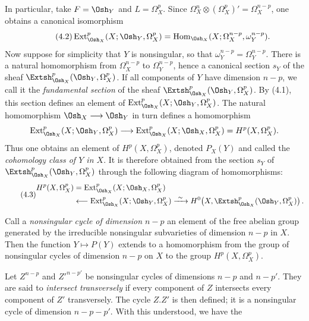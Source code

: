 In particular, take $F=\Osh_Y$ and $L=\Omega_X^{p}$. Since
$\Omega_X^{n}\otimes(\Omega_X^{p})'=\Omega_X^{n-p}$, one obtains a canonical
isomorphism
\begin{equation}\tag{4.2}
  \operatorname{Ext}_{\Osh_X}^{p}(X;\Osh_Y,\Omega_X^{p})
  =\operatorname{Hom}_{\Osh_X}
  (X;\Omega_X^{n-p},\omega_Y^{n-p}).
\end{equation}
Now suppose for simplicity that $Y$ is nonsingular, so that
$\omega_Y^{n-p}=\Omega_Y^{n-p}$. There is a natural homomorphism from
$\Omega_X^{n-p}$ to $\Omega_Y^{n-p}$, hence a canonical section $s_Y$ of the
sheaf $\Extsh_{\Osh_X}^{p}(\Osh_Y,\Omega_X^{p})$. If all components of $Y$ have
dimension $n-p$, we call it the \emph{fundamental section} of the sheaf
$\Extsh_{\Osh_X}^{p}(\Osh_Y,\Omega_X^{p})$. By (4.1), this section defines an
element of $\operatorname{Ext}_{\Osh_X}^{p}(X;\Osh_Y,\Omega_X^{p})$. The natural
homomorphism $\Osh_X\longrightarrow\Osh_Y$ in turn defines a homomorphism
\[
  \operatorname{Ext}_{\Osh_X}^{p}(X;\Osh_Y,\Omega_X^{p})
  \longrightarrow
  \operatorname{Ext}_{\Osh_X}^{p}(X;\Osh_X,\Omega_X^{p})
  =H^{p}(X,\Omega_X^{p}).
\]
Thus one obtains an element of $H^{p}(X,\Omega_X^{p})$, denoted $P_X(Y)$ and
called the \emph{cohomology class of $Y$ in $X$}. It is therefore obtained from
the section $s_Y$ of $\Extsh_{\Osh_X}^{p}(\Osh_Y,\Omega_X^{p})$ through the
following diagram of homomorphisms:
\begin{equation}\tag{4.3}
\begin{aligned}
H^{p}(X,\Omega_X^{p})
&=\operatorname{Ext}_{\Osh_X}^{p}(X;\Osh_X,\Omega_X^{p})\\
&\longleftarrow\operatorname{Ext}_{\Osh_X}^{p}(X;\Osh_Y,\Omega_X^{p})
\xrightarrow{\ \sim\ }
H^{0}\!\left(X,\Extsh_{\Osh_X}^{p}(\Osh_Y,\Omega_X^{p})\right).
\end{aligned}
\end{equation}

Call a \emph{nonsingular cycle of dimension $n-p$} an element of the free
abelian group generated by the irreducible nonsingular subvarieties of dimension
$n-p$ in $X$. Then the function $Y\longmapsto P(Y)$ extends to a homomorphism
from the group of nonsingular cycles of dimension $n-p$ on $X$ to the group
$H^{p}(X,\Omega_X^{p})$.

Let $Z^{n-p}$ and $Z'^{n-p'}$ be nonsingular cycles of dimensions $n-p$ and
$n-p'$. They are said to \emph{intersect transversely} if every component of
$Z$ intersects every component of $Z'$ transversely. The cycle $Z.Z'$ is then
defined; it is a nonsingular cycle of dimension $n-p-p'$. With this understood,
we have the

